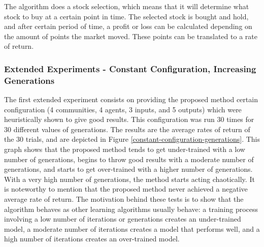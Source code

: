 \documentclass[a4paper,twoside]{article}
\begin{document}

The algorithm does a stock selection, which means that
it will determine what stock to buy at a certain point in time. The
selected stock is bought and hold, and after certain period of time,
a profit or loss can be calculated depending on the amount of points
the market moved. These points can be translated to a rate of
return. %

\subsubsection{Extended Experiments - Constant Configuration, Increasing Generations}

The first extended experiment consists on providing the proposed
method certain configuration (4 communities, 4 agents, 3 inputs, and 5
outputs) which were heuristically shown to give good results. This
configuration was run 30 times for 30 different values of 
generations. The results are the average rates of return of the 30
trials, and are depicted in Figure
\ref{constant-configuration-generations}. This graph shows that the
proposed method tends to get under-trained with a low number of
generations, begins to throw good results with a moderate number of
generations, and starts to get over-trained with a higher number of
generations. With a very high number of generations, the method starts
acting chaotically. It is noteworthy to mention that the proposed
method never achieved a negative average rate of return. %
%
The motivation behind these tests is to show that the algorithm
behaves as other learning algorithms usually behave: a training process involving a
low number of iterations or generations creates an under-trained
model, a moderate number of iterations creates a model that performs
well, and a high number of iterations creates an over-trained model. %
\end{document}
